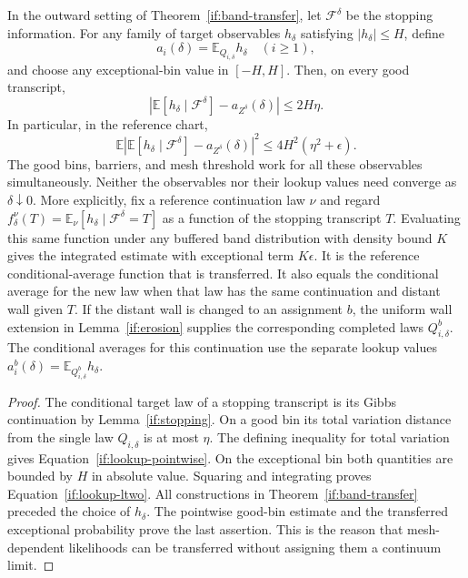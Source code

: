 \begin{corollary}
\label{if:descriptor-averages}
In the outward setting of Theorem~\ref{if:band-transfer}, let
$\mathcal F^\delta$ be the stopping information.  For any family
of target observables $h_\delta$ satisfying $|h_\delta|\le H$, define
\[
       a_i(\delta)=\mathbb E_{Q_{i,\delta}}h_\delta
             \quad (i\ge1),
\]
and choose any exceptional-bin value in $[-H,H]$.  Then, on every
good transcript,
\begin{equation}\label{if:lookup-pointwise}
  \left|\mathbb E[h_\delta\mid\mathcal F^\delta]
             -a_{Z^\delta}(\delta)\right|\le 2H\eta.
\end{equation}
In particular, in the reference chart,
\begin{equation}\label{if:lookup-ltwo}
  \mathbb E\left|\mathbb E[h_\delta\mid\mathcal F^\delta]
             -a_{Z^\delta}(\delta)\right|^2
                  \le 4H^2(\eta^2+\epsilon).
\end{equation}
The good bins, barriers, and mesh threshold work for all these
observables simultaneously.  Neither the observables nor their
lookup values need converge as $\delta\downarrow0$.  More explicitly,
fix a reference continuation law $\nu$ and regard
$f_\delta^\nu(T)=\mathbb E_\nu[h_\delta\mid\mathcal F^\delta=T]$
as a function of the stopping transcript $T$.  Evaluating this same
function under any buffered band distribution with density bound
$K$ gives the integrated estimate with exceptional term $K\epsilon$.
It is the reference conditional-average function that is transferred.
It also equals the conditional average for the new law when that
law has the same continuation and distant wall given $T$.
If the distant wall is changed to an assignment $b$, the uniform
wall extension in Lemma~\ref{if:erosion} supplies the corresponding
completed laws $Q_{i,\delta}^{b}$. The conditional averages for this
continuation use the separate lookup values
$a_i^{b}(\delta)=\mathbb E_{Q_{i,\delta}^{b}}h_\delta$.
\end{corollary}

\begin{proof}
The conditional target law of a stopping transcript is its Gibbs
continuation by Lemma~\ref{if:stopping}.  On a good bin its total
variation distance from the single law $Q_{i,\delta}$ is at most
$\eta$.  The defining inequality for total variation gives
Equation~\eqref{if:lookup-pointwise}.  On the exceptional bin both
quantities are bounded by $H$ in absolute value.  Squaring and
integrating proves Equation~\eqref{if:lookup-ltwo}.  All constructions
in Theorem~\ref{if:band-transfer} preceded the choice of $h_\delta$.
The pointwise good-bin estimate and the transferred exceptional
probability prove the last assertion.  This is the reason that
mesh-dependent likelihoods can be transferred without assigning
them a continuum limit.
\end{proof}


